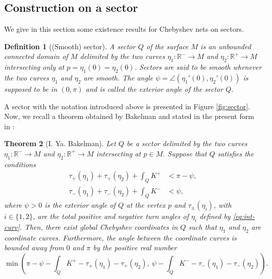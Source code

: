 \documentclass{article}
\newcommand{\R}{\mathbb{R}}
\newcommand{\surf}{M}
\newcommand{\sect}{Q}
\newtheorem{theorem}{Theorem}
\newtheorem{definitionE}[theorem]{Definition}
\theoremstyle{remark}
\theoremstyle{prpart}
\begin{document}
\subsection{Construction on a sector}\label{subsubsec:cheb-sector}
We give in this section some existence results for Chebyshev nets on sectors.
\begin{definitionE}[(Smooth) sector]\label{def:sector}
  A \emph{sector} $\sect$ of the surface $\surf$ is an unbounded connected domain of $\surf$ delimited by the two curves $\eta_1 : \R^-\to \surf$ and $\eta_2 : \R^+\to\surf$ intersecting only at $p=\eta_1(0)=\eta_2(0)$. \emph{Sectors} are said to be smooth whenever the two curves $\eta_1$ and $\eta_2$ are smooth. The angle $\psi = \angle(\eta_1'(0), \eta_2'(0))$ is supposed to be in $(0,\pi)$ and is called the exterior angle of the \emph{sector} $\sect$.
\end{definitionE}


A sector with the notation introduced above is presented in Figure \ref{fig:sector}. Now, we recall a theorem obtained by Bakelman \cite{Bak65} and stated in the present form in \cite{Bur05}:
\begin{theorem}[I. Ya. Bakelman]\label{thm:bak-sect}
Let $\sect$ be a sector delimited by the two curves $\eta_1:\R^-\to\surf$ and $\eta_2:\R^+\to\surf$ intersecting at $p\in\surf$. Suppose that $\sect$ satisfies the conditions
  \begin{subequations}\label{eq:cond-sector}
    \begin{alignat}{2}  \label{eq:cond-sector1}
     \tau_+(\eta_1) + \tau_+(\eta_2) + \int_\sect K^+ &< \pi-\psi,  \\
     \tau_-(\eta_1) + \tau_-(\eta_2) + \int_\sect K^- &< \psi, \label{eq:cond-sector2}
  \end{alignat}
\end{subequations}
where $\psi>0$ is the exterior angle of $\sect$ at the vertex $p$ and $\tau_\pm(\eta_i)$, with $i\in\{1,2\}$, are the total positive and negative turn angles of $\eta_i$ defined by \eqref{eq:int-curv}. Then, there exist global Chebyshev coordinates in $\sect$ such that $\eta_1$ and $\eta_2$ are coordinate curves. 
Furthermore, the angle between the coordinate curves is bounded away from $0$ and $\pi$ by the positive real number
\begin{equation*}
\min\left(\pi-\psi-\int_\sect K^+-\tau_+(\eta_1)-\tau_+(\eta_2),~ 
\psi-\int_\sect K^- - \tau_-(\eta_1)-\tau_-(\eta_2)\right).
\end{equation*}
\end{theorem}
\end{document}
